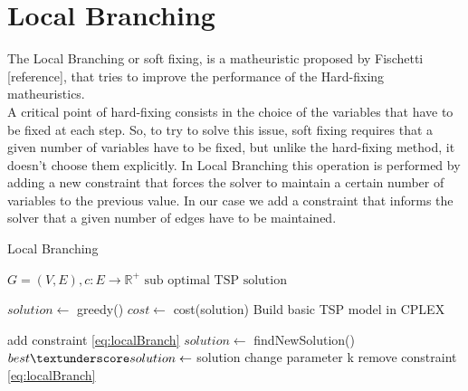 \section{Local Branching}

The Local Branching or soft fixing, is a matheuristic proposed by Fischetti [reference], that tries to improve the performance of the Hard-fixing matheuristics.\\
A critical point of hard-fixing consists in the choice of the variables that have to be fixed at each step. So, to try to solve this issue, soft fixing requires that a given number of variables have to be fixed, but unlike the hard-fixing method, it doesn’t choose them explicitly. In Local Branching this operation is performed by adding a new constraint that forces the solver to maintain a certain number of variables to the previous value. In our case we add a constraint that informs the solver that a given number of edges have to be maintained. \\

\begin{algorithm}[h!]
    \caption{Local Branching}\label{algo:SoftFixing}
    \begin{algorithmic}[1]
    \Require $G = (V,E), c:E \to \mathbb{R}^+$
    \Ensure $\text{sub optimal TSP solution}$

    \State $solution \gets$ greedy()
    \State $cost \gets $ cost(solution)
    \State Build basic TSP model in CPLEX



    \State add constraint \ref{eq:localBranch}
    \State $solution \gets$ findNewSolution()
    \State $ best\textunderscore solution \gets$ solution
    \State change parameter k
    \EndIf
    \State remove constraint \ref{eq:localBranch}
    \EndWhile

    \end{algorithmic}
\end{algorithm}

